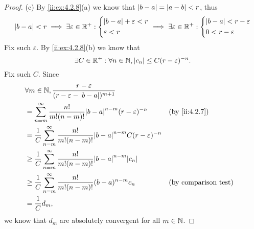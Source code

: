 \begin{proof}{(c)}
  By \cref{ii:ex:4.2.8}(a) we know that \(\left\lvert b - a\right\rvert = \left\lvert a - b\right\rvert < r\), thus
  \[
    \left\lvert b - a\right\rvert < r \implies \exists \varepsilon \in \mathbb{R}^+ : \begin{dcases}
      \left\lvert b - a\right\rvert + \varepsilon < r \\
      \varepsilon < r
    \end{dcases} \implies \exists \varepsilon \in \mathbb{R}^+ : \begin{dcases}
      \left\lvert b - a\right\rvert < r - \varepsilon \\
      0 < r - \varepsilon
    \end{dcases}
  \]
  Fix such \(\varepsilon\).
  By \cref{ii:ex:4.2.8}(b) we know that
  \[
    \exists C \in \mathbb{R}^+ : \forall n \in \mathbb{N}, \left\lvert c_n\right\rvert \leq C (r - \varepsilon)^{-n}.
  \]
  Fix such \(C\).
  Since
  \begin{align*}
     & \forall m \in \N, \dfrac{r - \varepsilon}{(r - \varepsilon - \abs{b - a})^{m + 1}}                                                       \\
     & = \sum_{n = m}^\infty \dfrac{n!}{m! (n - m)!} \abs{b - a}^{n - m} (r - \varepsilon)^{-n}                &  & \by{ii:4.2.7}               \\
     & = \dfrac{1}{C} \sum_{n = m}^\infty \dfrac{n!}{m! (n - m)!} \abs{b - a}^{n - m} C (r - \varepsilon)^{-n}                                  \\
     & \geq \dfrac{1}{C} \sum_{n = m}^\infty \dfrac{n!}{m! (n - m)!} \abs{b - a}^{n - m} \abs{c_n}                                              \\
     & \geq \dfrac{1}{C} \sum_{n = m}^\infty \dfrac{n!}{m! (n - m)!} (b - a)^{n - m} c_n                       &  & \text{(by comparison test)} \\
     & = \dfrac{1}{C} d_m,
  \end{align*}
  we know that \(d_m\) are absolutely convergent for all \(m \in \mathbb{N}\).
\end{proof}

